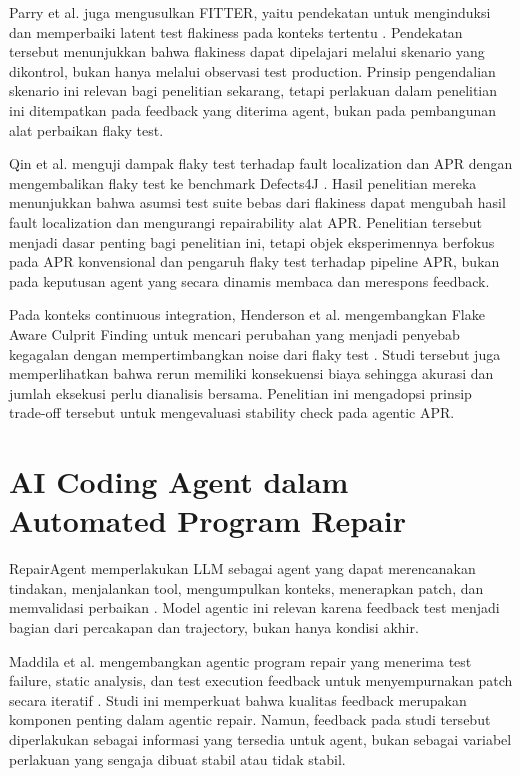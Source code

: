 Parry et al. juga mengusulkan FITTER, yaitu pendekatan untuk menginduksi dan memperbaiki latent test flakiness pada konteks tertentu \cite{parry2020fitter}. Pendekatan tersebut menunjukkan bahwa flakiness dapat dipelajari melalui skenario yang dikontrol, bukan hanya melalui observasi test production. Prinsip pengendalian skenario ini relevan bagi penelitian sekarang, tetapi perlakuan dalam penelitian ini ditempatkan pada feedback yang diterima agent, bukan pada pembangunan alat perbaikan flaky test.

Qin et al. menguji dampak flaky test terhadap fault localization dan APR dengan mengembalikan flaky test ke benchmark Defects4J \cite{qin2021flaky}. Hasil penelitian mereka menunjukkan bahwa asumsi test suite bebas dari flakiness dapat mengubah hasil fault localization dan mengurangi repairability alat APR. Penelitian tersebut menjadi dasar penting bagi penelitian ini, tetapi objek eksperimennya berfokus pada APR konvensional dan pengaruh flaky test terhadap pipeline APR, bukan pada keputusan agent yang secara dinamis membaca dan merespons feedback.

Pada konteks continuous integration, Henderson et al. mengembangkan Flake Aware Culprit Finding untuk mencari perubahan yang menjadi penyebab kegagalan dengan mempertimbangkan noise dari flaky test \cite{flakeaware2023}. Studi tersebut juga memperlihatkan bahwa rerun memiliki konsekuensi biaya sehingga akurasi dan jumlah eksekusi perlu dianalisis bersama. Penelitian ini mengadopsi prinsip trade-off tersebut untuk mengevaluasi stability check pada agentic APR.

\section{AI Coding Agent dalam Automated Program Repair}

RepairAgent memperlakukan LLM sebagai agent yang dapat merencanakan tindakan, menjalankan tool, mengumpulkan konteks, menerapkan patch, dan memvalidasi perbaikan \cite{repairagent2025}. Model agentic ini relevan karena feedback test menjadi bagian dari percakapan dan trajectory, bukan hanya kondisi akhir.

Maddila et al. mengembangkan agentic program repair yang menerima test failure, static analysis, dan test execution feedback untuk menyempurnakan patch secara iteratif \cite{maddila2026}. Studi ini memperkuat bahwa kualitas feedback merupakan komponen penting dalam agentic repair. Namun, feedback pada studi tersebut diperlakukan sebagai informasi yang tersedia untuk agent, bukan sebagai variabel perlakuan yang sengaja dibuat stabil atau tidak stabil.

